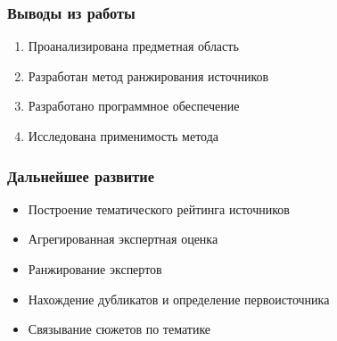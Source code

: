 \documentclass[hyperref={unicode}, 14pt, aspectratio=169]{beamer}
\begin{document}
\begin{frame}
    \frametitle{Выводы из работы}

    \begin{block}{}
        \begin{enumerate}
            \item Проанализирована предметная область
            \item Разработан метод ранжирования источников
            \item Разработано программное обеспечение
            \item Исследована применимость метода
        \end{enumerate}
    \end{block}
\end{frame}

\begin{frame}
    \frametitle{Дальнейшее развитие}

    \begin{block}{}
        \begin{itemize}
            \item Построение тематического рейтинга источников
            \item Агрегированная экспертная оценка
            \item Ранжирование экспертов
            \item Нахождение дубликатов и определение первоисточника
            \item Связывание сюжетов по тематике
        \end{itemize}
    \end{block}
\end{frame}
\end{document}

